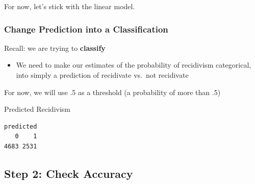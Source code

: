 \documentclass[
  letterpaper,
  DIV=11,
  numbers=noendperiod]{scrreprt}
\newenvironment{Shaded}{\begin{snugshade}}{\end{snugshade}}
\newcommand{\AttributeTok}[1]{\textcolor[rgb]{0.40,0.45,0.13}{#1}}
\newcommand{\CommentTok}[1]{\textcolor[rgb]{0.37,0.37,0.37}{#1}}
\newcommand{\DecValTok}[1]{\textcolor[rgb]{0.68,0.00,0.00}{#1}}
\newcommand{\FunctionTok}[1]{\textcolor[rgb]{0.28,0.35,0.67}{#1}}
\newcommand{\NormalTok}[1]{\textcolor[rgb]{0.00,0.23,0.31}{#1}}
\newcommand{\OtherTok}[1]{\textcolor[rgb]{0.00,0.23,0.31}{#1}}
\newcommand{\SpecialCharTok}[1]{\textcolor[rgb]{0.37,0.37,0.37}{#1}}
\providecommand{\tightlist}{%
  \setlength{\itemsep}{0pt}\setlength{\parskip}{0pt}}\usepackage{longtable,booktabs,array}
\begin{document}
For now, let's stick with the linear model.

\hypertarget{change-prediction-into-a-classification}{%
\subsubsection{Change Prediction into a
Classification}\label{change-prediction-into-a-classification}}

Recall: we are trying to \textbf{classify}

\begin{itemize}
\tightlist
\item
  We need to make our estimates of the probability of recidivism
  categorical, into simply a prediction of recidivate vs.~not recidivate
\end{itemize}

For now, we will use .5 as a threshold (a probability of more than .5)

\begin{Shaded}
\end{Shaded}

Predicted Recidivism

\begin{Shaded}
\end{Shaded}

\begin{verbatim}
predicted
   0    1 
4683 2531 
\end{verbatim}

\hypertarget{step-2-check-accuracy-1}{%
\subsection{Step 2: Check Accuracy}\label{step-2-check-accuracy-1}}
\end{document}
